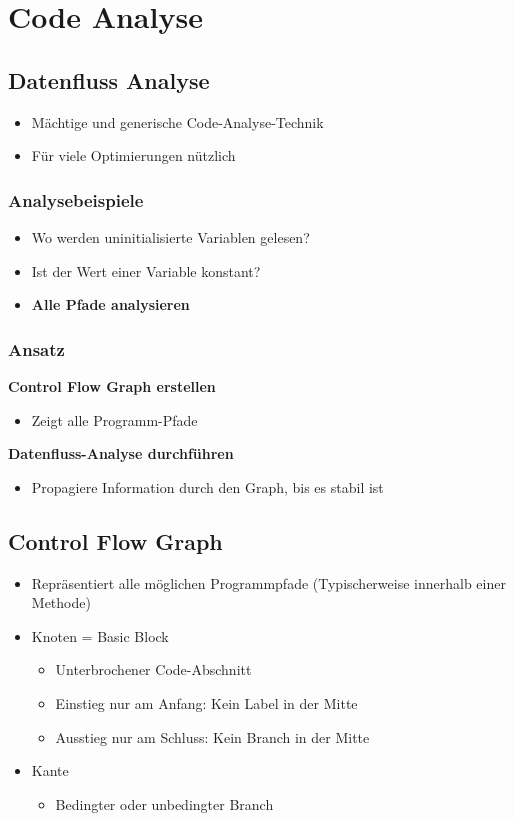 \section{Code Analyse}
\subsection{Datenfluss Analyse}
\begin{itemize}
    \item Mächtige und generische Code-Analyse-Technik
    \item Für viele Optimierungen nützlich
\end{itemize}
\subsubsection{Analysebeispiele}
\begin{itemize}
    \item Wo werden uninitialisierte Variablen gelesen?
    \item Ist der Wert einer Variable konstant?
    \item \textbf{Alle Pfade analysieren}
\end{itemize}
\subsubsection{Ansatz}
\textbf{Control Flow Graph erstellen}
\begin{itemize}
    \item Zeigt alle Programm-Pfade
\end{itemize}
\textbf{Datenfluss-Analyse durchführen}
\begin{itemize}
    \item Propagiere Information durch den Graph, bis es stabil ist
\end{itemize}

\subsection{Control Flow Graph}
\begin{itemize}
    \item Repräsentiert alle möglichen Programmpfade (Typischerweise innerhalb einer Methode)
    \item Knoten = Basic Block
    \begin{itemize}
        \item Unterbrochener Code-Abschnitt
        \item Einstieg nur am Anfang: Kein Label in der Mitte
        \item Ausstieg nur am Schluss: Kein Branch in der Mitte
    \end{itemize}
    \item Kante
    \begin{itemize}
        \item Bedingter oder unbedingter Branch
    \end{itemize}
\end{itemize}

